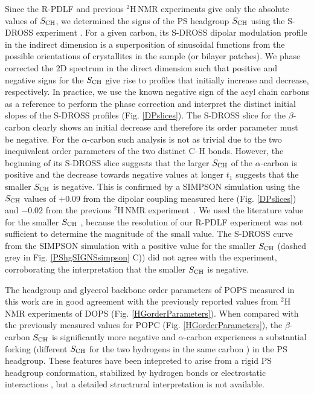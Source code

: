 \documentclass[journal=jpcbfk,manuscript=article]{achemso}
\begin{document}
Since the R-PDLF and previous $^2$H\,NMR experiments \cite{browning80,roux91} give 
only the absolute values of  $S_{\rm CH}$, we determined the signs of the PS headgroup
 $S_{\rm CH}$ using the S-DROSS experiment \cite{gross97}.
For a given carbon, its S-DROSS dipolar modulation profile in the indirect dimension is a superposition
of sinusoidal functions from the possible orientations of crystallites in the sample (or bilayer patches).
We phase corrected the 2D spectrum in the direct dimension such that positive and negative signs for the $S_{\rm CH}$ 
give rise to profiles that initially increase and decrease, respectively.
In practice, we use the known negative sign of the acyl chain carbons as a reference to perform
the phase correction and interpret the distinct initial slopes of the S-DROSS profiles (Fig. \ref{DPslices}). 
The S-DROSS slice for the $\beta$-carbon clearly shows an initial decrease and therefore its order parameter must be negative.
For the $\alpha$-carbon such analysis is not as trivial due to the two inequivalent order parameters of the two distinct C--H bonds.
However, the beginning of its S-DROSS slice suggests that the larger $S_{\rm CH}$ of the $\alpha$-carbon is positive and the
decrease towards negative values at longer $t_1$ suggests that the smaller  $S_{\rm CH}$ is negative.    
This is confirmed by a SIMPSON simulation
using the  $S_{\rm CH}$ values of $+0.09$ from the dipolar coupling measured here (Fig. \ref{DPslices})
and $-0.02$ from the previous $^2$H\,NMR experiment~\cite{roux91}.
We used the literature value for the smaller  $S_{\rm CH}$ , because the
resolution of our R-PDLF experiment was not sufficient to determine the
magnitude of the small value.
The S-DROSS curve from the SIMPSON simulation with a positive value for the smaller  $S_{\rm CH}$ 
(dashed grey in Fig. \ref{PShgSIGNSsimpson} C)) did not agree with the experiment, 
corroborating the interpretation that the smaller  $S_{\rm CH}$  is negative.

The headgroup and glycerol backbone order parameters of 
POPS measured in this work are in good agreement with the previously reported
values from $^2$H\,NMR experiments of DOPS \cite{browning80} (Fig. \ref{HGorderParameters}).
When compared with the previously measured values for POPC \cite{ferreira13} (Fig. \ref{HGorderParameters}),
the $\beta$-carbon  $S_{\rm CH}$ is significantly more negative and $\alpha$-carbon
experiences a substantial forking (different  $S_{\rm CH}$ for the two hydrogens in the same carbon \cite{ollila16}) in the PS headgroup.
These features have been intepreted to arise from a rigid PS headgroup
conformation, stabilized by hydrogen bonds or electrostatic
interactions \cite{browning80,buldt81}, but a detailed structrural interpretation is not
available. 
\end{document}
